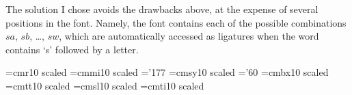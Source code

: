 The solution I chose avoids the drawbacks above, at the expense of
several positions in the font.  Namely, the font contains each of
the possible combinations $sa$, $sb$, \dots, $sw$, which are
automatically accessed as ligatures when the word contains `s'
followed by a letter.

\pageinsert
{
\font\twelverm=cmr10 scaled 
\font\twelvei=cmmi10 scaled \skewchar\twelvei='177
\font\twelvesy=cmsy10 scaled \skewchar\twelvesy='60
\font\twelvebf=cmbx10 scaled 
\font\twelvett=cmtt10 scaled \hyphenchar{}
\font\twelvesl=cmsl10 scaled 
\font\twelveit=cmti10 scaled 

\def\twelvepoint{\def\rm{\fam0\twelverm}%
  \textfont0=\twelverm
  \textfont1=\twelvei
  \textfont2=\twelvesy
  \textfont3=\tenex
  \def\it{\fam\itfam\twelveit}%
  \textfont\itfam=\twelveit
  \def\sl{\fam\slfam\twelvesl}%
  \textfont\slfam=\twelvesl
  \def\bf{\fam\bffam\twelvebf}%
  \textfont\bffam=\twelvebf \scriptfont\bffam=\sevenbf
   \scriptscriptfont\bffam=\fivebf
  \def\tt{\fam\ttfam\twelvett}%
  \textfont\ttfam=\twelvett
  \tt \ttglue=.5em plus.25em minus.15em
  \normalbaselineskip=14.5pt
  \setbox\strutbox=\hbox{\vrule height10.5pt depth4pt width0pt}%
  \normalbaselines\rm}

}

